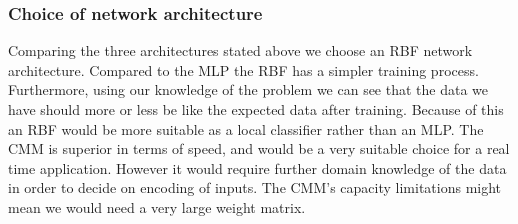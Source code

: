 \documentclass[a4paper, 11pt]{article}
\begin{document}


\subsubsection*{Choice of network architecture}
Comparing the three architectures stated above we choose an RBF network architecture. Compared to the MLP the RBF has a simpler training process. Furthermore, using our knowledge of the problem we can see that the data we have should more or less be like the expected data after training. Because of this an RBF would be more suitable as a local classifier rather than an MLP.
The CMM is superior in terms of speed, and would be a very suitable choice for a real time application. However it would require further domain knowledge of the data in order to decide on encoding of inputs. The CMM's capacity limitations might mean we would need a very large weight matrix. 
\end{document}
